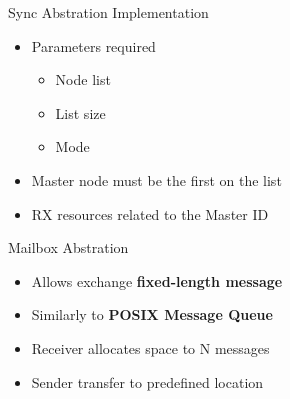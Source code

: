 		\begin{frame}[fragile]{Sync Abstration Implementation}
			\begin{itemize}
				\item Parameters required
				\begin{itemize}
					\item Node list
					\item List size
					\item Mode
				\end{itemize}
				\item Master node must be the first on the list
				\item RX resources related to the Master ID
			\end{itemize}

		\end{frame}

		\begin{frame}[fragile]{Mailbox Abstration}
			\begin{itemize}
				\item Allows exchange \textbf{fixed-length message}
				\item Similarly to \textbf{POSIX Message Queue}
				\item Receiver allocates space to N messages
				\item Sender transfer to predefined location
			\end{itemize}



		\end{frame}

